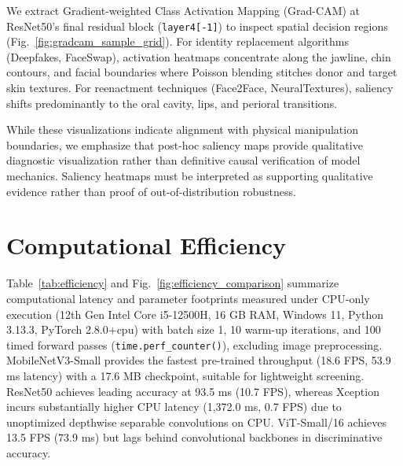 \documentclass[conference]{IEEEtran}
\begin{document}
We extract Gradient-weighted Class Activation Mapping (Grad-CAM) \cite{selvaraju2017gradcam} at ResNet50's final residual block (\texttt{layer4[-1]}) to inspect spatial decision regions (Fig.~\ref{fig:gradcam_sample_grid}). For identity replacement algorithms (Deepfakes, FaceSwap), activation heatmaps concentrate along the jawline, chin contours, and facial boundaries where Poisson blending stitches donor and target skin textures. For reenactment techniques (Face2Face, NeuralTextures), saliency shifts predominantly to the oral cavity, lips, and perioral transitions.

While these visualizations indicate alignment with physical manipulation boundaries, we emphasize that post-hoc saliency maps provide qualitative diagnostic visualization rather than definitive causal verification of model mechanics. Saliency heatmaps must be interpreted as supporting qualitative evidence rather than proof of out-of-distribution robustness.


\section{Computational Efficiency}
\label{sec:complexity}

Table~\ref{tab:efficiency} and Fig.~\ref{fig:efficiency_comparison} summarize computational latency and parameter footprints measured under CPU-only execution (12th Gen Intel Core i5-12500H, 16 GB RAM, Windows 11, Python 3.13.3, PyTorch 2.8.0+cpu) with batch size 1, 10 warm-up iterations, and 100 timed forward passes (\texttt{time.perf\_counter()}), excluding image preprocessing. MobileNetV3-Small provides the fastest pre-trained throughput (18.6 FPS, 53.9 ms latency) with a 17.6 MB checkpoint, suitable for lightweight screening. ResNet50 achieves leading accuracy at 93.5 ms (10.7 FPS), whereas Xception incurs substantially higher CPU latency (1,372.0 ms, 0.7 FPS) due to unoptimized depthwise separable convolutions on CPU. ViT-Small/16 achieves 13.5 FPS (73.9 ms) but lags behind convolutional backbones in discriminative accuracy.
\end{document}
